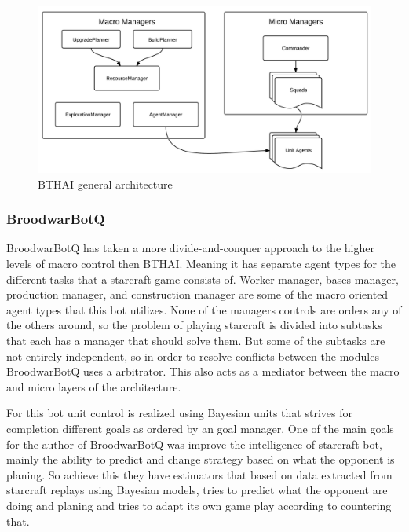 \begin{figure}[h!tbp]
\centering
\includegraphics[scale=0.8]{graphics/bthai.png}
\caption{BTHAI general architecture}
\label{fig:bthaiarch}
\end{figure}

\subsubsection{BroodwarBotQ}
BroodwarBotQ has taken a more divide-and-conquer approach to the higher levels of macro control then BTHAI. Meaning it has separate agent types for the different tasks that a starcraft game consists of. Worker manager, bases manager, production manager, and construction manager are some of the macro oriented agent types that this bot utilizes. None of the managers controls are orders any of the others around, so the problem of playing starcraft is divided into subtasks that each has a manager that should solve them. But some of the subtasks are not entirely independent, so in order to resolve conflicts between the modules BroodwarBotQ uses a arbitrator. This also acts as a mediator between the macro and micro layers of the architecture. 

For this bot unit control is realized using Bayesian units that strives for completion different goals as ordered by an goal manager.\cite{synnaeve2011bayesian} One of the main goals for the author of BroodwarBotQ was improve the intelligence of starcraft bot, mainly the ability to predict and change strategy based on what the opponent is planing. So achieve this they have estimators that based on data extracted from starcraft replays using Bayesian models, tries to predict what the opponent are doing and planing and tries to adapt its own game play according to countering that. 


